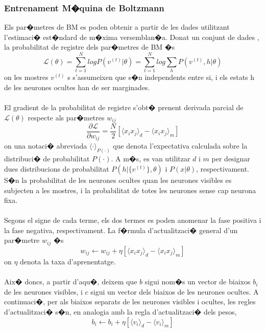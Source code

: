 \documentclass[12pt,a4paper,openright,oneside]{article}
\numberwithin{equation}{section}
\theoremstyle{definition}
\begin{document}
\subsubsection{Entrenament M�quina de Boltzmann}
Els par�metres de BM es poden obtenir a partir de les dades utilitzant l'estimaci� est�ndard de m�xima versemblan�a. Donat un conjunt de dades ${}$, la probabilitat de registre dels par�metres de BM �s 
\begin{equation}
\mathcal{L}(\theta) = \sum_{t=1}^N logP(v^{(t)}|\theta) =  \sum_{t=1}^N log \sum_h P(v^{(t)},h|\theta)
\end{equation} 
on les mostres ${v^{(t)}}$ s s'assumeixen que s�n independents entre si, i els estats h de les neurones ocultes han de ser marginades.\\\\
El gradient de la probabilitat de registre s'obt� prenent derivada parcial de ${\mathcal{L}(\theta)}$ respecte als par�metres ${w_{ij}}$ 
\[\frac{\partial\mathcal{L}}{\partial w_{ij}} = \frac{N}{2} [\langle x_ix_j \rangle_d - \langle x_ix_j \rangle_m] \]
on una notaci� abreviada ${\langle\cdot\rangle_{P(\cdot)}}$ que denota l'expectativa calculada sobre la distribuci� de probabilitat ${P(\cdot)}$. A m�s, es van utilitzar ${d}$ i ${m}$ per designar dues distribucions de probabilitat ${P(h|\{v^{(t)}\},\theta)}$ i ${P(x|\theta)}$, respectivament. S�n la probabilitat de les neurones ocultes quan les neurones visibles es subjecten a les mostres, i la probabilitat de totes les neurones sense cap neurona fixa. \\\\
Segons el signe de cada terme, els dos termes es poden anomenar la fase positiva i la fase negativa, respectivament. La f�rmula d'actualitzaci� general d'un par�metre ${w_{ij}}$ �s 
\begin{equation}
w_{ij}\leftarrow w_{ij} + \eta [\langle x_ix_j \rangle_d - \langle x_ix_j \rangle_m]
\end{equation}
on ${\eta}$ denota la taxa d'aprenentatge. \\\\
Aix� doncs, a partir d'aqu�, deixem que ${b}$ sigui nom�s un vector de biaixos ${b_i}$ de les neurones visibles, i ${c}$ sigui un vector dels biaixos de les neurones ocultes. A continuaci�, per als biaixos separats de les neurones visibles i ocultes, les regles d'actualitzaci� s�n, en analogia amb la regla d'actualitzaci� dels pesos, 
\begin{equation}
b_{i}\leftarrow b_{i} + \eta [\langle v_i \rangle_d - \langle v_i \rangle_m]
\end{equation} 
\end{document}
